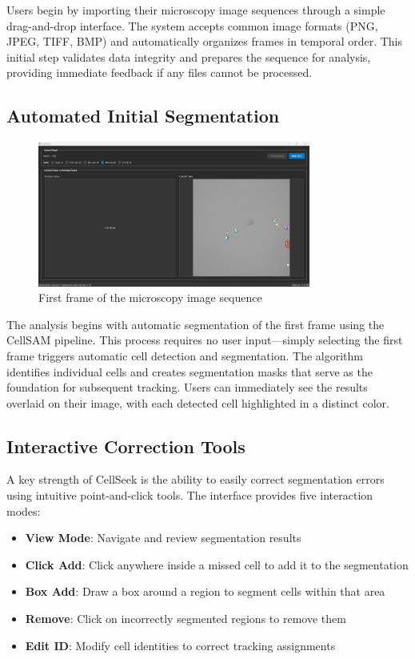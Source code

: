 \documentclass[../cellseek_paper.tex]{subfiles}
\begin{document}
Users begin by importing their microscopy image sequences through a simple drag-and-drop interface. The system accepts common image formats (PNG, JPEG, TIFF, BMP) and automatically organizes frames in temporal order. This initial step validates data integrity and prepares the sequence for analysis, providing immediate feedback if any files cannot be processed.

\subsection{Automated Initial Segmentation}

\begin{figure}[H]
  \centering
  \includegraphics[width=0.8\textwidth]{images/first_frame.jpg}
  \caption{First frame of the microscopy image sequence}
  \label{fig:first_frame}
\end{figure}

The analysis begins with automatic segmentation of the first frame using the CellSAM pipeline. This process requires no user input—simply selecting the first frame triggers automatic cell detection and segmentation. The algorithm identifies individual cells and creates segmentation masks that serve as the foundation for subsequent tracking. Users can immediately see the results overlaid on their image, with each detected cell highlighted in a distinct color.

\subsection{Interactive Correction Tools}

A key strength of CellSeek is the ability to easily correct segmentation errors using intuitive point-and-click tools. The interface provides five interaction modes:

\begin{itemize}
  \item \textbf{View Mode}: Navigate and review segmentation results
  \item \textbf{Click Add}: Click anywhere inside a missed cell to add it to the segmentation
  \item \textbf{Box Add}: Draw a box around a region to segment cells within that area
  \item \textbf{Remove}: Click on incorrectly segmented regions to remove them
  \item \textbf{Edit ID}: Modify cell identities to correct tracking assignments
\end{itemize}
\end{document}
